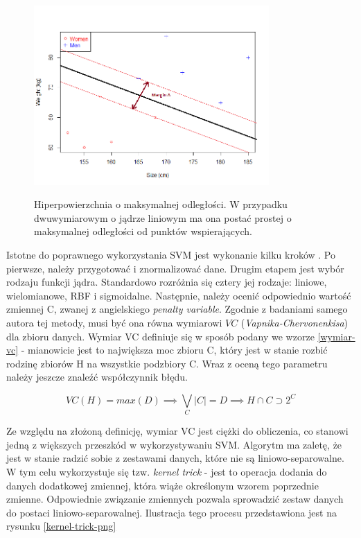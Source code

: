 \documentclass[12pt,a4paper,oneside]{report} %
\begin{document}
\begin{figure}
\centering
\includegraphics[width=0.8\textwidth]{hyperplane.png}
\label{hyperplane-png}
\caption{Hiperpowierzchnia o maksymalnej odległości. W przypadku dwuwymiarowym o jądrze liniowym ma ona postać prostej o maksymalnej odległości od punktów wspierających.}
\end{figure}


Istotne do poprawnego wykorzystania SVM jest wykonanie kilku kroków \cite{chih-wei}. Po pierwsze, należy przygotować i znormalizować dane. Drugim etapem jest wybór rodzaju funkcji jądra. Standardowo rozróżnia się cztery jej rodzaje: liniowe, wielomianowe, RBF i sigmoidalne. Następnie, należy ocenić odpowiednio wartość zmiennej C, zwanej z angielskiego \emph{penalty variable}. Zgodnie z badaniami samego autora tej metody, musi być ona równa wymiarowi $VC$ (\emph{Vapnika-Chervonenkisa}) dla zbioru danych. Wymiar VC definiuje się w sposób podany we wzorze \ref{wymiar-vc} - mianowicie jest to największa moc zbioru C, który jest w stanie rozbić rodzinę zbiorów H na wszystkie podzbiory C. Wraz z oceną tego parametru należy jeszcze znaleźć współczynnik błędu. \par

\begin{equation}
VC(H) = max(D) \implies \bigvee\limits_C \lvert C \rvert = D \implies H \cap C \supset 2^{C}
\end{equation}
\label{wymiar-vc}

Ze względu na złożoną definicję, wymiar VC jest ciężki do obliczenia, co stanowi jedną z większych przeszkód w wykorzystywaniu SVM. Algorytm ma zaletę, że jest w stanie radzić sobie z zestawami danych, które nie są liniowo-separowalne. W tym celu wykorzystuje się tzw. \emph{kernel trick} - jest to operacja dodania do danych dodatkowej zmiennej, która wiąże określonym wzorem poprzednie zmienne. Odpowiednie związanie zmiennych pozwala sprowadzić zestaw danych do postaci liniowo-separowalnej. \cite{kernel-trick} Ilustracja tego procesu przedstawiona jest na rysunku \ref{kernel-trick-png}
\end{document}

